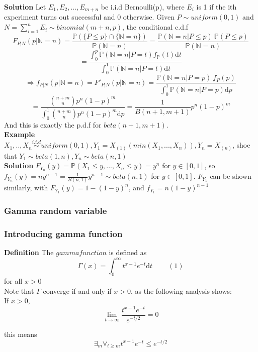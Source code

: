 \documentclass[a4paper,12pt]{article}
\begin{document}
\textbf{Solution}
Let $E_1, E_2, ..., E_{m+n}$ be i.i.d Bernoulli(p), where $E_i$ is 1 if the ith experiment turns out successful and 0 otherwise. Given $P \sim uniform(0, 1)$ and $N = \sum_{i=1}^n E_i \sim binomial(m+n, p)$, the conditional c.d.f 
$$F_{P|N}(p|\mathbb{N}=n) = \frac{\mathbb{P}( \{P \leq p\} \cap \{\mathbb{N} = n\} )}{\mathbb{P}(\mathbb{N} = n)} = \frac{\mathbb{P}( \mathbb{N} = n | P \leq p )\  \mathbb{P}( P \leq p )}{\mathbb{P}(\mathbb{N} = n)} $$
$$= \frac{\int_0^p \mathbb{P} (\mathbb{N} = n | P=t) f_\mathbb{P}(t)\mathrm{d}t }{\int_0^1 \mathbb{P} (\mathbb{N} = n | P=t) \mathrm{d}t }$$
$$\Rightarrow f_{P|N}(p|\mathbb{N}=n) = F'_{P|N}(p|\mathbb{N}=n) =   \frac{\mathbb{P} (\mathbb{N} = n | P=p)\ f_P(p)}{\int_0^1 \mathbb{P} (\mathbb{N} = n | P=p) \mathrm{d}p }$$
$$= \frac{ {n+m \choose n}p^n(1-p)^m }{\int_0^1{ n+m \choose n}p^n(1-p)^m\mathrm{d}p} = \frac{1}{B(n+1, m+1)} p^n (1-p)^m$$
And this is exactly the p.d.f for $beta(n+1, m+1)$.\\

\textbf{Example} $X_1, .., X_n \overset{i.i.d}{\sim} uniform(0, 1), Y_1 = X_{(1)} (min( X_1, ..., X_n )), Y_n = X_{(n)}$, shoe that $Y_1 \sim beta(1, n), Y_n \sim beta(n, 1)$\\

\textbf{Solution}
$F_{Y_n}(y) = \mathbb{P}(X_1 \leq y, ..., X_n \leq y) = y^n $ for $y \in [0, 1]$, so $f_{Y_n}(y) = ny^{n-1} = \frac{1}{B(n, 1)}y^{n-1} \sim beta(n, 1)$ for $y \in [0, 1]$. $F_{Y_1}$ can be shown similarly, with $F_{Y_1}(y) = 1-(1-y)^n$, and $f_{Y_1} = n(1-y)^{n-1}$

\subsubsection{Gamma random variable}
\subsubsection*{Introducing gamma function}
\textbf{Definition} The $gamma function$ is defined as
{\center}$$\Gamma(x) = \int_0^{\infty} t^{x-1}e^{-t} \mathrm{d}t\ \ \ \ \ \ \ \ \ \ (1)$${\center} 
for all $x > 0$ \\

Note that $\Gamma$ converge if and only if $x>0$, as the following analysis shows:\\

If $x>0$,  $$\lim_{t\rightarrow\infty} \frac{t^{x-1}e^{-t}}{e^{-t/2}} = 0$$

this means $$ \exists_m \forall_{t\geq m}  t^{x-1}e^{-t} \leq {e^{-t/2}} $$
\end{document}
